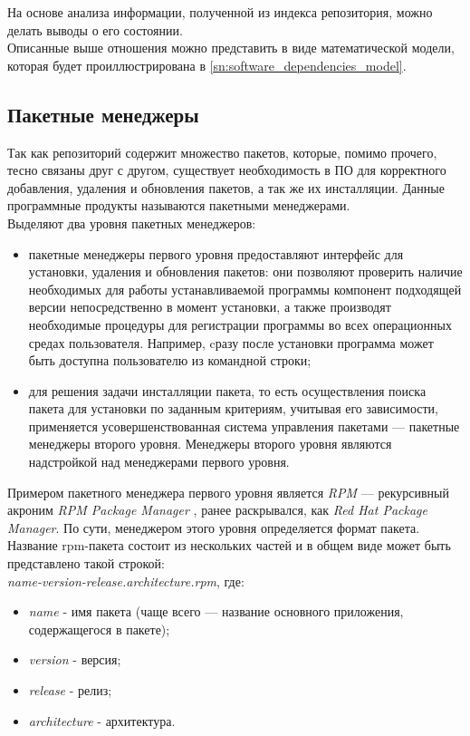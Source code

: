 На основе анализа информации, полученной из индекса репозитория,
можно делать выводы о его состоянии. \\

Описанные выше отношения можно представить в виде математической модели,
которая будет проиллюстрирована в \ref{sn:software_dependencies_model}.


\subsection{Пакетные менеджеры}
Так как репозиторий содержит множество пакетов, которые, помимо прочего, тесно
связаны друг с другом, существует необходимость в ПО для
корректного добавления, удаления и обновления пакетов, а так же их инсталляции.
Данные программные продукты называются пакетными менеджерами.\\

Выделяют два уровня пакетных менеджеров:
\begin{itemize}
\item{пакетные менеджеры первого уровня предоставляют интерфейс для установки,
удаления и обновления пакетов: они позволяют проверить наличие необходимых для
работы устанавливаемой программы компонент подходящей версии непосредственно 
в момент установки, а также производят необходимые процедуры для регистрации 
программы во всех операционных средах пользователя. Например, cразу после установки 
программа может быть доступна пользователю из командной строки;}
\item{для решения задачи инсталляции пакета, то есть осуществления поиска пакета для
установки по заданным критериям, учитывая его зависимости, применяется усовершенствованная
система управления пакетами --- пакетные менеджеры второго уровня. Менеджеры второго уровня 
являются надстройкой над менеджерами первого уровня.}
\end{itemize}

Примером пакетного менеджера первого уровня является  \textit{RPM} --- рекурсивный акроним 
\textit{RPM Package Manager} \cite{rpm}, ранее раскрывался, как \textit{Red Hat Package Manager}.
По сути, менеджером этого уровня определяется формат пакета.\\

Название rpm-пакета состоит из нескольких частей и в общем виде может быть представлено
такой строкой: \\
\textit{name-version-release.architecture.rpm}, где:
\begin{itemize}
\item{\textit{name} - имя пакета (чаще всего --- название основного приложения, содержащегося в пакете);}
\item{\textit{version} - версия;}
\item{\textit{release} - релиз;}
\item{\textit{architecture} - архитектура.}
\end{itemize}

